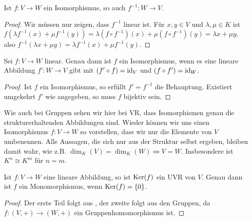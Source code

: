 \begin{lemma}
	Ist $f:V\to W$ ein Isomorphismus, so auch $f^{-1}:W\to V$.
\end{lemma}
\begin{proof}
	Wir müssen nur zeigen, dass $f^{-1}$ linear ist. Für $x,y\in V$ und $\lambda,\mu\in K$ ist $f(\lambda f^{-1}(x) + 
	\mu f^{-1}(y))=\lambda (f\circ f^{-1})(x) + \mu (f\circ f^{-1})(y)=\lambda x + \mu y$, also $f^{-1}(\lambda x + 
	\mu y)=\lambda f^{-1}(x) + \mu f^{-1}(y)$.
\end{proof}

\begin{proposition}
	Sei $f:V\to W$ linear. Genau dann ist $f$ ein Isomorphismus, wenn es eine lineare Abbildung $f':W
	\to V$ gibt mit $(f'\circ f)=\operatorname{id}_V$ und $(f\circ f')=\operatorname{id}_W$.
\end{proposition}
\begin{proof}
	Ist $f$ ein Isomorphismus, so erfüllt $f'=f^{-1}$ die Behauptung. Existiert umgekehrt $f'$ wie angegeben, so muss 
	$f$ bijektiv sein.
\end{proof}

\begin{remark}
	Wie auch bei Gruppen sehen wir hier bei VR, dass Isomorphismen genau die strukturerhaltenden 
	Abbildungen sind. Wieder können wir uns einen Isomorphismus $f:V\to W$ so vorstellen, dass wir nur die Elemente von 
	$V$ umbenennen. Alle Aussagen, die sich nur aus der Struktur selbst ergeben, bleiben damit wahr, wie z.B. $\dim_K(V)=
	\dim_K(W)\iff V=W$. Insbesondere ist $K^n \cong K^m$ für $n=m$.
\end{remark}

\begin{proposition}
	Ist $f:V\to W$ eine lineare Abbildung, so ist $\operatorname{Ker}(f)$ ein UVR von $V$. Genau dann ist $f$ ein 
	Monomorphismus, wenn $\operatorname{Ker}(f)=\{0\}$.
\end{proposition}
\begin{proof}
	Der erste Teil folgt aus , der zweite folgt aus den Gruppen, da $f:(V,+)\to (W,+)$ ein 
	Gruppenhomomorphismus ist.
\end{proof}